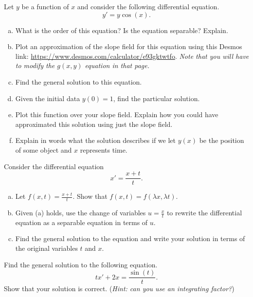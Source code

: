 \documentclass[12pt]{article} %
\begin{document}
\begin{problem}
Let $y$ be a function of $x$ and consider the following differential equation.
\[
y' = y\cos(x).
\]
\begin{enumerate}[(a)]
    \item What is the order of this equation? Is the equation separable? Explain.
    \item Plot an approximation of the slope field for this equation using this Desmos link: \url{https://www.desmos.com/calculator/e93gktwtfo}. \emph{Note that you will have to modify the $g(x,y)$ equation in that page.}
    \item Find the general solution to this equation.
    \item Given the initial data $y(0)=1$, find the particular solution.
    \item Plot this function over your slope field. Explain how you could have approximated this solution using just the slope field.
    \item Explain in words what the solution describes if we let $y(x)$ be the position of some object and $x$ represents time.
\end{enumerate}
\end{problem}

\begin{problem}
Consider the differential equation
\[
x'=\frac{x+t}{t}.
\]
\begin{enumerate}[(a)]
    \item Let $f(x,t)=\frac{x+t}{t}$. Show that $f(x,t)=f(\lambda x, \lambda t)$.
    \item Given (a) holds, use the change of variables $u=\frac{x}{t}$ to rewrite the differential equation as a separable equation in terms of $u$.
    \item Find the general solution to the equation and write your solution in terms of the original variables $t$ and $x$.
\end{enumerate}
\end{problem}

\begin{problem}
Find the general solution to the following equation.
\[
tx'+2x=\frac{\sin(t)}{t}.
\]
Show that your solution is correct. (\emph{Hint: can you use an integrating factor?})
\end{problem}
\end{document}
